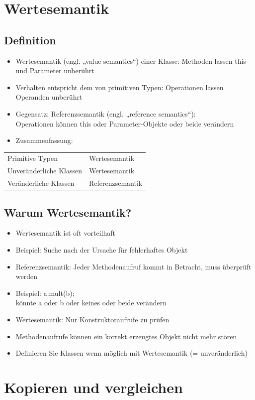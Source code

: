 \section{Wertesemantik}

\subsection{Definition}
\begin{itemize}
\item Wertesemantik (engl. „value semantics“) einer Klasse: Methoden lassen this und Parameter unberührt
\item Verhalten entspricht dem von primitiven Typen: Operationen lassen Operanden unberührt
\item Gegensatz: Referenzsemantik (engl. „reference semantics“): \\
Operationen können this oder Parameter-Objekte oder beide verändern
\item Zusammenfassung:
\end{itemize}
\begin{tabular}{ll}
Primitive Typen & Wertesemantik \\
Unveränderliche Klassen & Wertesemantik\\
Veränderliche Klassen & Referenzsemantik\\
\end{tabular}

\subsection{Warum Wertesemantik?}
\begin{itemize}
\item Wertesemantik ist oft vorteilhaft
\item Beispiel: Suche nach der Ursache für fehlerhaftes Objekt
\item Referenzsemantik: Jeder Methodenaufruf kommt in Betracht, muss überprüft werden
\item Beispiel: a.mult(b);\\
könnte a oder b oder keines oder beide verändern
\item Wertesemantik: Nur Konstruktoraufrufe zu prüfen
\item Methodenaufrufe können ein korrekt erzeugtes Objekt nicht mehr stören
\item Definieren Sie Klassen wenn möglich mit Wertesemantik (= unveränderlich)
\end{itemize}
%
%
%
\section{Kopieren und vergleichen}

